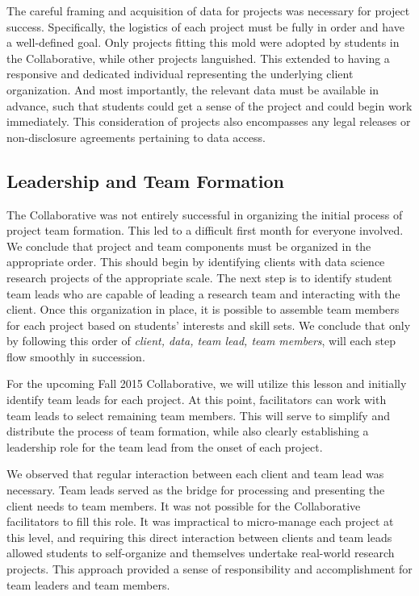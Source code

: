 \documentclass[12pt]{article}
\begin{document}
The careful framing and acquisition of data for projects was necessary for project success.  Specifically, the logistics of each project must be fully in order and have a well-defined goal.  Only projects fitting this mold were adopted by students in the Collaborative, while other projects languished.  This extended to having a responsive and dedicated individual representing the underlying client organization.  And most importantly, the relevant data must be available in advance, such that students could get a sense of the project and could begin work immediately.  This consideration of projects also encompasses any legal releases or non-disclosure agreements pertaining to data access.

\subsection{Leadership and Team Formation}

The Collaborative was not entirely successful in organizing the initial process of project team formation.  This led to a difficult first month for everyone involved.  We conclude that project and team components must be organized in the appropriate order.  This should begin by identifying clients with data science research projects of the appropriate scale.  The next step is to identify student team leads who are capable of leading a research team and interacting with the client.  Once this organization in place, it is possible to assemble team members for each project based on students' interests and skill sets.  We conclude that only by following this order of \emph{client, data, team lead, team members}, will each step flow smoothly in succession.

For the upcoming Fall 2015 Collaborative, we will utilize this lesson and initially identify team leads for each project.  At this point, facilitators can work with team leads to select remaining team members. This will serve to simplify and distribute the process of team formation, while also clearly establishing a leadership role for the team lead from the onset of each project.

We observed that regular interaction between each client and team lead was necessary. Team leads served as the bridge for processing and presenting the client needs to team members.  It was not possible for the Collaborative facilitators to fill this role.  It was impractical to micro-manage each project at this level, and requiring this direct interaction between clients and team leads allowed students to self-organize and themselves undertake real-world research projects.  This approach provided a sense of responsibility and accomplishment for team leaders and team members.
\end{document}
